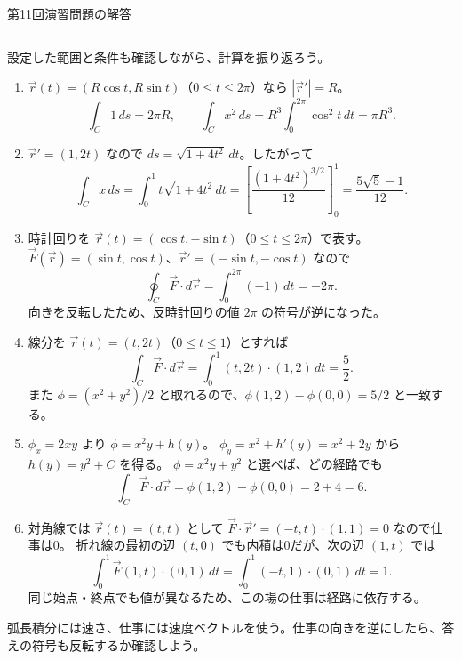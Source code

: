 \documentclass[a4paper,10pt,pdflatex,ja=standard,jafont=ipaex-type1,
  magstyle=real,scale=1]{bxjsarticle}
\newcommand{\handouttitle}[1]{%
  \begin{center}
    {\Large\color{ink}#1}\par\vspace{3mm}
    {\color{accent}\rule{0.88\linewidth}{0.7pt}}
  \end{center}\vspace{-2mm}}
\newcommand{\keybox}[1]{\par\vspace{3pt}\begingroup
  \setlength{\fboxsep}{4pt}%
  \colorbox{soft}{\parbox{\dimexpr\linewidth-2\fboxsep\relax}{\small #1}}%
  \endgroup\par\vspace{2pt}}
\newenvironment{problems}
  {\begin{enumerate}[leftmargin=2em,itemsep=3pt,topsep=3pt,parsep=0pt,
    font=\color{accent}]}
  {\end{enumerate}}
\begin{document}
\newpage
\handouttitle{第11回\quad 演習問題の解答}
{\small 設定した範囲と条件も確認しながら、計算を振り返ろう。}\par
\begin{problems}
\setlength{\itemsep}{7pt}
\item $\vec r(t)=(R\cos t,R\sin t)$（$0\le t\le2\pi$）なら $|\vec r'|=R$。
$$
 \int_C1\,ds=2\pi R,\qquad
 \int_Cx^2\,ds=R^3\int_0^{2\pi}\cos^2t\,dt=\pi R^3.
$$

\item $\vec r'=(1,2t)$ なので $ds=\sqrt{1+4t^2}\,dt$。したがって
$$
 \int_Cx\,ds=\int_0^1t\sqrt{1+4t^2}\,dt
 =\left[\frac{(1+4t^2)^{3/2}}{12}\right]_0^1=\frac{5\sqrt5-1}{12}.
$$

\item 時計回りを $\vec r(t)=(\cos t,-\sin t)$（$0\le t\le2\pi$）で表す。
$\vec F(\vec r)=(\sin t,\cos t)$、$\vec r'=(-\sin t,-\cos t)$ なので
$$
 \oint_C\vec F\cdot d\vec r=\int_0^{2\pi}(-1)\,dt=-2\pi.
$$
向きを反転したため、反時計回りの値 $2\pi$ の符号が逆になった。

\item 線分を $\vec r(t)=(t,2t)$（$0\le t\le1$）とすれば
$$
 \int_C\vec F\cdot d\vec r=\int_0^1(t,2t)\cdot(1,2)\,dt=\frac52.
$$
また $\phi=(x^2+y^2)/2$ と取れるので、$\phi(1,2)-\phi(0,0)=5/2$ と一致する。

\item $\phi_x=2xy$ より $\phi=x^2y+h(y)$。
$\phi_y=x^2+h'(y)=x^2+2y$ から $h(y)=y^2+C$ を得る。
$\phi=x^2y+y^2$ と選べば、どの経路でも
$$
 \int_C\vec F\cdot d\vec r=\phi(1,2)-\phi(0,0)=2+4=6.
$$

\item 対角線では $\vec r(t)=(t,t)$ として
$\vec F\cdot\vec r'=(-t,t)\cdot(1,1)=0$ なので仕事は0。
折れ線の最初の辺 $(t,0)$ でも内積は0だが、次の辺 $(1,t)$ では
$$
 \int_0^1\vec F(1,t)\cdot(0,1)\,dt
 =\int_0^1(-t,1)\cdot(0,1)\,dt=1.
$$
同じ始点・終点でも値が異なるため、この場の仕事は経路に依存する。
\end{problems}
\keybox{弧長積分には速さ、仕事には速度ベクトルを使う。仕事の向きを逆にしたら、答えの符号も反転するか確認しよう。}
\end{document}
